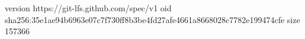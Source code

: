 version https://git-lfs.github.com/spec/v1
oid sha256:35e1ae94b6963e07c7f730ff8b3be4fd27afe4661a8668028c7782e199474cfe
size 157366
